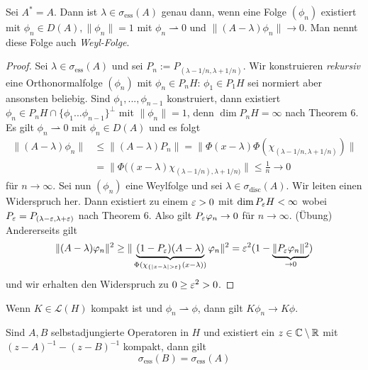 \documentclass{mycourse}
\begin{document}
\begin{st}[Weyl]\label{6.7}
Sei $A^*=A$. Dann ist $\lambda \in \sigma_{\text{ess}}(A)$ genau dann, wenn eine Folge $(\phi_n)$ existiert mit $\phi_n\in D(A), \|\phi_n\|=1$ mit $\phi_n \rightharpoonup 0$ und $\|(A-\lambda) \phi_n\| \to 0$. Man nennt diese Folge auch \emph{Weyl-Folge}.
\end{st}

\begin{proof} %
Sei $\lambda\in \sigma_{\text{ess}}(A)$ und sei $P_n:= P_{(\lambda-1/n, \lambda+ 1/n)}$. Wir konstruieren \emph{rekursiv} eine Orthonormalfolge $(\phi_n)$ mit $\phi_n\in P_n H$: $\phi_1 \in P_1H$ sei normiert aber ansonsten beliebig. Sind $\phi_1, ..., \phi_{n-1}$ konstruiert, dann existiert $\phi_n \in P_n H \cap \{\phi_1... \phi_{n-1}\}^\perp$ mit $\|\phi_n \| =1$, denn $\dim P_n H=\infty$ nach Theorem 6. Es gilt $\phi_n \rightharpoonup 0$ mit $\phi_n \in D(A)$ und es folgt
\begin{align*}
\|(A-\lambda) \phi_n \| &\le \| (A-\lambda) P_n\| = \| \Phi(x-\lambda) \Phi(\chi_{(\lambda-1/n, \lambda+1/n)}) \|\\
&= \| \Phi((x-\lambda) \chi_{(\lambda-1/n), \lambda + 1/n)} \| \le \frac{1}{n} \to 0
\end{align*}
für $n\to \infty$. Sei nun $(\phi_n)$ eine Weylfolge und sei $\lambda \in \sigma_{\text{disc}} (A)$. Wir leiten einen Widerspruch her. Dann existiert zu einem $\varepsilon >0$ mit $\dim P_\varepsilon H<\infty$ wobei $P_\varepsilon= P_{(\lambda-\varepsilon, \lambda+\varepsilon)}$ nach Theorem 6. Also gilt $P_\varepsilon \varphi_n \to 0$ für $n\to \infty$. (Übung)
Andererseits gilt
\[
\| (A-\lambda) \phi_n\|^2 \ge \| \underbrace{(1-P_\eps) (A-\lambda)}_{\Phi(\chi_{\{|x-\lambda|>\eps\}} (x-\lambda))} \phi_n\|^2 = \eps^2(1-\underbrace{\| P_\eps \phi_n\|^2}_{\to 0})
\]
und wir erhalten den Widerspruch zu $0 \ge \varepsilon^2 >0$.
\end{proof}
\begin{nt*}
Wenn $K\in \mathcal L(H)$ kompakt ist und $\phi_n \rightharpoonup \phi$, dann gilt $K\phi_n \to K\phi$.
\end{nt*}
\begin{st}\label{6.8}
Sind $A,B$ selbstadjungierte Operatoren in $H$ und existiert ein $z\in \mathbb{C}\setminus\mathbb{R}$ mit $(z-A)^{-1} - (z-B)^{-1}$ kompakt, dann gilt
\[
\sigma_{\text{ess}} (B) = \sigma_{\text{ess}}(A)
\]
\end{st}
\end{document}
